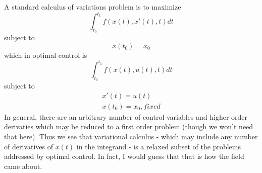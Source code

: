 \documentclass[11pt]{article}
\numberwithin{equation}{section}
\begin{document}
A standard calculus of variations problem is to maximize
\begin{equation}
\int_{t_0}^{t_1}f(x(t),x'(t),t)dt
\end{equation}
subject to
\begin{equation}
x(t_0) = x_0
\end{equation}
which in optimal control is 
\begin{equation}
\int_{t_0}^{t_1}f(x(t),u(t),t)dt
\end{equation}
subject to
\begin{align}
x'(t) = u(t) \\
x(t_0) = x_0, fixed
\end{align}
In general, there are an arbitrary number of control variables and higher order derivaties which may be reduced to a first order problem (though we won't need that here). Thus we see that variational calculus - which may include any number of derivatives of $x(t)$ in the integrand - is a relaxed subset of the problems addressed by optimal control. In fact, I would guess that that is how the field came about.
\end{document}

